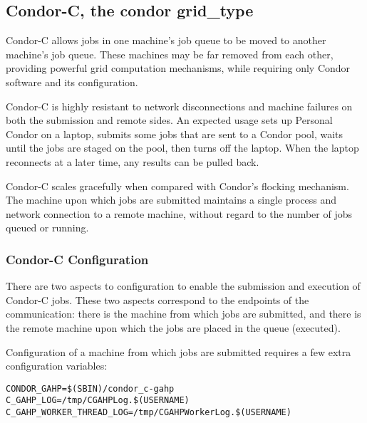 
\subsection{\label{sec:Condor-C}Condor-C, the condor grid\_type }

Condor-C allows jobs in one machine's job queue to
be moved to another machine's job queue.
These machines may be far removed from each other,
providing powerful grid computation mechanisms,
while requiring only Condor software and its configuration.

Condor-C is highly resistant to network disconnections and machine failures on both the submission and remote sides.
An expected usage
sets up Personal Condor on a laptop,
submits some jobs that are sent to a Condor pool,
waits until the jobs are staged on the pool,
then turns off the laptop.
When the laptop reconnects at a later time,
any results can be pulled back.

Condor-C scales gracefully when compared with Condor's flocking
mechanism.
The machine upon which jobs are submitted
maintains a single process and network connection to a remote machine,
without regard to the number
of jobs queued or running.

\subsubsection{\label{sec:Condor-C-Config}Condor-C Configuration}
There are two aspects to configuration to enable the
submission and execution of Condor-C jobs.
These two aspects correspond to the endpoints of the 
communication: there is the machine from which jobs are
submitted, and there is the remote machine upon which the
jobs are placed in the queue (executed).

Configuration of a machine from which jobs are submitted
requires a few extra configuration variables:

\footnotesize
\begin{verbatim}
CONDOR_GAHP=$(SBIN)/condor_c-gahp
C_GAHP_LOG=/tmp/CGAHPLog.$(USERNAME)
C_GAHP_WORKER_THREAD_LOG=/tmp/CGAHPWorkerLog.$(USERNAME)
\end{verbatim}
\normalsize

